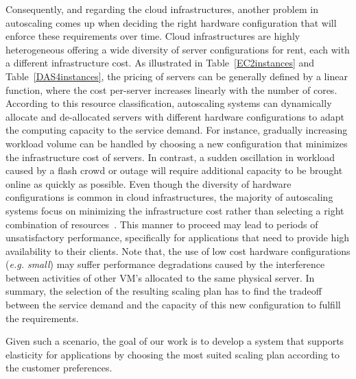 Consequently, and regarding the cloud infrastructures, another problem in autoscaling comes up when deciding the right hardware configuration that will enforce these requirements over time. Cloud infrastructures are highly heterogeneous offering a wide diversity of server configurations for rent, each with a different infrastructure cost. As illustrated in Table~\ref{EC2instances} and Table~\ref{DAS4instances}, the pricing of servers can be generally defined by a linear function, where the cost per-server increases linearly with the number of cores. According to this resource classification, autoscaling systems can dynamically allocate and de-allocated servers with different hardware configurations to adapt the computing capacity to the service demand. For instance, gradually increasing workload volume can be handled by choosing a new configuration that minimizes the infrastructure cost of servers. In contrast, a sudden oscillation in workload caused by a flash crowd or outage will require additional capacity to be brought online as quickly as possible. Even though the diversity of hardware configurations is common in cloud infrastructures, the majority of autoscaling systems focus on minimizing the infrastructure cost rather than selecting a right combination of resources~\cite{urgaonkar_agile_2008,dejavu2012,herbst_2013}. This manner to proceed may lead to periods of unsatisfactory performance, specifically for applications that need to provide high availability to their clients. Note that, the use of low cost hardware configurations (\emph{e.g. small}) may suffer performance degradations caused by the interference between activities of other VM's allocated to the same physical server. In summary, the selection of the resulting scaling plan has to find the tradeoff between the service demand and the capacity of this new configuration to fulfill the requirements.

Given such a scenario, the goal of our work is to develop a system that supports elasticity for applications by choosing the most suited scaling plan according to the customer preferences.















